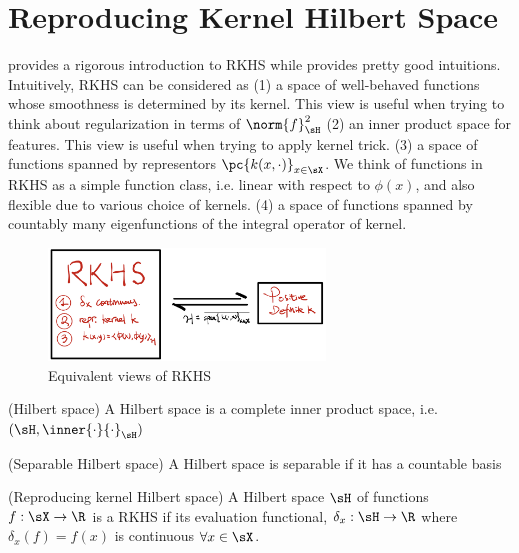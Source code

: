 \documentclass[11pt]{article}
\begin{document}
\section{Reproducing Kernel Hilbert Space}

\cite{grettonWhatRKHS2012} provides a rigorous introduction to RKHS while \cite{grettonIntroductionRKHSSimple2019} provides pretty good intuitions. 
Intuitively, RKHS can be considered as (1) a space of well-behaved functions whose smoothness is determined by its kernel. This view is useful when trying to think about regularization in terms of $\norm{f}_{\sH}^2$ (2) an inner product space for features. This view is useful when trying to apply kernel trick. (3) a space of functions spanned by representors $\pc{k(x,\cdot)}_{x\in\sX}$. We think of functions in RKHS as a simple function class, i.e. linear with respect to $\phi(x)$, and also flexible due to various choice of kernels. (4) a space of functions spanned by countably many eigenfunctions of the integral operator of kernel.


\begin{figure}[h!]
\begin{center}
    \includegraphics[height=3cm]{assets/rkhs_equivalence_schematics} 
    \caption{Equivalent views of RKHS}
\end{center}
\end{figure}


\begin{definition}
    (Hilbert space) A Hilbert space is a complete inner product space, i.e. $(\sH, \inner{\cdot}{\cdot}_{\sH})$
\end{definition}

\begin{definition}
    (Separable Hilbert space) A Hilbert space is separable if it has a countable basis
\end{definition}

\begin{definition}
    (Reproducing kernel Hilbert space) A Hilbert space $\sH$ of functions $f:\sX\to\R$ is a RKHS if its evaluation functional, $\delta_x:\sH\to\R$ where $\delta_x(f) = f(x)$ is continuous $\forall x\in\sX$.
\end{definition}
\end{document}
